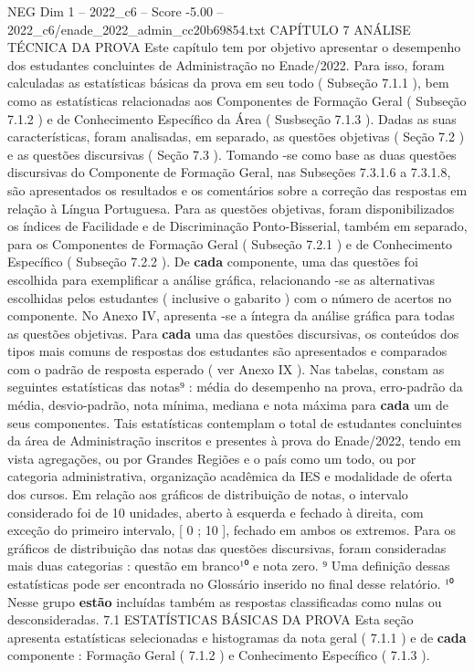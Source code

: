 \begin{textsample}{NEG Dim 1 – 2022\_c6 – Score -5.00 – 2022\_c6/enade\_2022\_admin\_cc20b69854.txt}  \label{ex:f1_neg_189}
CAPÍTULO 7 ANÁLISE TÉCNICA DA PROVA Este capítulo tem por objetivo apresentar o desempenho dos estudantes concluintes de Administração no Enade/2022.
Para isso, foram calculadas as estatísticas básicas da prova em seu todo ( Subseção 7.1.1 ), bem como as estatísticas relacionadas aos Componentes de Formação Geral ( Subseção 7.1.2 ) e de Conhecimento Específico da Área ( Susbseção 7.1.3 ).
Dadas as suas características, foram analisadas, em separado, as questões objetivas ( Seção 7.2 ) e as questões discursivas ( Seção 7.3 ).
Tomando -se como base as duas questões discursivas do Componente de Formação Geral, nas Subseções 7.3.1.6 a 7.3.1.8, são apresentados os resultados e os comentários sobre a correção das respostas em relação à Língua Portuguesa.
Para as questões objetivas, foram disponibilizados os índices de Facilidade e de Discriminação Ponto-Bisserial, também em separado, para os Componentes de Formação Geral ( Subseção 7.2.1 ) e de Conhecimento Específico ( Subseção 7.2.2 ).
De \textbf{cada} componente, uma das questões foi escolhida para exemplificar a análise gráfica, relacionando -se as alternativas escolhidas pelos estudantes ( inclusive o gabarito ) com o número de acertos no componente.
No Anexo IV, apresenta -se a íntegra da análise gráfica para todas as questões objetivas.
Para \textbf{cada} uma das questões discursivas, os conteúdos dos tipos mais comuns de respostas dos estudantes são apresentados e comparados com o padrão de resposta esperado ( ver Anexo IX ).
Nas tabelas, constam as seguintes estatísticas das notas⁹ : média do desempenho na prova, erro-padrão da média, desvio-padrão, nota mínima, mediana e nota máxima para \textbf{cada} um de seus componentes.
Tais estatísticas contemplam o total de estudantes concluintes da área de Administração inscritos e presentes à prova do Enade/2022, tendo em vista agregações, ou por Grandes Regiões e o país como um todo, ou por categoria administrativa, organização acadêmica da IES e modalidade de oferta dos cursos.
Em relação aos gráficos de distribuição de notas, o intervalo considerado foi de 10 unidades, aberto à esquerda e fechado à direita, com exceção do primeiro intervalo, [ 0 ; 10 ], fechado em ambos os extremos.
Para os gráficos de distribuição das notas das questões discursivas, foram consideradas mais duas categorias : questão em branco¹⁰ e nota zero. ⁹ Uma definição dessas estatísticas pode ser encontrada no Glossário inserido no final desse relatório. ¹⁰ Nesse grupo \textbf{estão} incluídas também as respostas classificadas como nulas ou desconsideradas. 7.1 ESTATÍSTICAS BÁSICAS DA PROVA Esta seção apresenta estatísticas selecionadas e histogramas da nota geral ( 7.1.1 ) e de \textbf{cada} componente : Formação Geral ( 7.1.2 ) e Conhecimento Específico ( 7.1.3 ).

\end{textsample}
